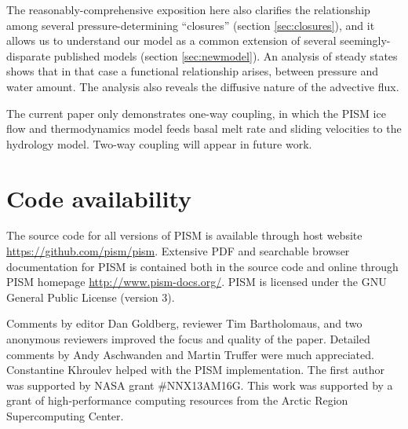 \documentclass[gmd]{copernicus}   %
\begin{document}
The reasonably-comprehensive exposition here also clarifies the relationship among several pressure-determining ``closures'' (section \ref{sec:closures}), and it allows us to understand our model as a common extension of several seemingly-disparate published models (section \ref{sec:newmodel}).  An analysis of steady states shows that in that case a functional relationship arises, between pressure and water amount.  The analysis also reveals the diffusive nature of the advective flux.

The current paper only demonstrates one-way coupling, in which the PISM ice flow and thermodynamics model feeds basal melt rate and sliding velocities to the hydrology model.  Two-way coupling  will appear in future work.


\section{Code availability}  \label{sec:availability}

The source code for all versions of PISM is available through host website \url{https://github.com/pism/pism}.  Extensive PDF and searchable browser documentation for PISM is contained both in the source code and online through PISM homepage \url{http://www.pism-docs.org/}.  PISM is licensed under the GNU General Public License (version 3).


\begin{acknowledgements}
Comments by editor Dan Goldberg, reviewer Tim Bartholomaus, and two anonymous reviewers improved the focus and quality of the paper.  Detailed comments by Andy Aschwanden and Martin Truffer were much appreciated.  Constantine Khroulev helped with the PISM implementation.  The first author was supported by NASA grant \#NNX13AM16G.  This work was supported by a grant of high-performance computing resources from the Arctic Region Supercomputing Center.
\end{acknowledgements}
\end{document}
